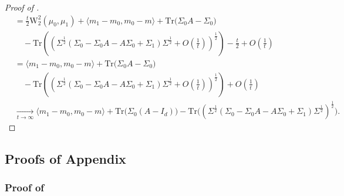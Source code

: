 \documentclass[twoside]{article}
\newcommand{\W}{\mathrm{W}}
\newcommand{\tr}{\mathrm{Tr}}
\def\mo{m_{0}}
\def\m1{m_{1}}
\def\So{\Sigma_{0}}
\def\S1{\Sigma_{1}}
\begin{document}
\begin{proof}[Proof of ]
\begin{equation}
\begin{aligned}
            &= \frac{t}{2} \W_2^2(\mu_0,\mu_1) + \langle \m1-\mo, \mo-m\rangle + \tr\big(\So A-\So\big) \\ &\quad -  \tr\left(\left(\Sigma^\frac12 (\So-\So A-A\So+\S1)\Sigma^\frac12 + O\left(\frac{1}{t}\right) \right)^\frac12\right) - \frac{t}{2} + O\left(\frac{1}{t}\right) \\
            &= \langle \m1-\mo, \mo-m\rangle + \tr\big(\So A-\So\big) \\ &\quad -  \tr\left(\left(\Sigma^\frac12 (\So-\So A-A\So+\S1)\Sigma^\frac12 + O\left(\frac{1}{t}\right) \right)^\frac12\right) + O\left(\frac{1}{t}\right) \\
            &\xrightarrow[t\to\infty]{}  \langle \m1-\mo, \mo-m\rangle + \tr\big(\So(A-I_d) \big) - \tr\big((\Sigma^\frac12(\So-\So A - A\So + \S1)\Sigma^\frac12)^\frac12\big).
        \end{aligned}
    \end{equation}
\end{proof}



\subsection{Proofs of Appendix}\label{appendix:proofs_appendix}



\subsubsection{Proof of }
\end{document}
